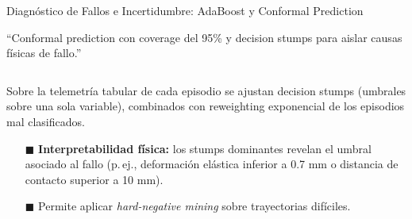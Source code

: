 \documentclass[aspectratio=169,10pt,xcolor={dvipsnames,table}]{beamer}
\newcommand{\BannerFont}{\fontsize{7.5}{9.2}\selectfont\bfseries}       %
\newcommand{\CardTitleFont}{\fontsize{7.5}{9}\selectfont\bfseries}      %
\newcommand{\BodyFont}{\fontsize{6.2}{7.8}\selectfont}                  %
\newcommand{\CardArc}{2pt}                 %
\newcommand{\CardRule}{0.6pt}              %
\newcommand{\BannerArc}{1.5pt}             %
\newcommand{\BannerRule}{0.5pt}            %
\newcommand{\BannerLeftRule}{2.5pt}        %
\newcommand{\CardHeightDouble}{42.5mm}     %
\newcommand{\BannerCentral}[2][UCNCyan]{%
  \begin{tcolorbox}[
    enhanced,
    colback=#1!10,
    colframe=#1,
    boxrule=\BannerRule,
    leftrule=\BannerLeftRule,
    arc=\BannerArc,
    top=0.35mm, bottom=0.35mm, left=2mm, right=2mm
  ]
    {\BannerFont\raggedright\textcolor{UCNBlue}{#2}\par}
  \end{tcolorbox}%
  \vspace{-2.5mm}%
}
\newcommand{\BannerRef}[1]{{\mdseries\fontsize{5}{6}\selectfont\textcolor{TextDark!65}{\cite{#1}}}} %
\begin{document}
\begin{frame}{Diagnóstico de Fallos e Incertidumbre: AdaBoost y Conformal Prediction}
  \BannerCentral[GoldGORE]{``Conformal prediction con coverage del 95\% y decision stumps para aislar causas físicas de fallo.'' \BannerRef{freund1997decision,angelopoulos2023conformal,wang2026srif,qi2026gpc}}
  \vspace{0.8mm}
  \begin{columns}[T, onlytextwidth]
    \begin{column}{0.485\textwidth}
      \begin{tcolorbox}[
        enhanced,
        colback=WhiteBg,
        colframe=GoldGORE,
        arc=\CardArc,
        boxrule=\CardRule,
        height=\CardHeightDouble,
        title={\CardTitleFont AdaBoost con Decision Stumps},
        colbacktitle=GoldGORE,
        coltitle=WhiteBg,
        top=1.0mm, bottom=1.0mm, left=1.6mm, right=1.6mm
      ]
        {\BodyFont
        Sobre la telemetría tabular de cada episodio se ajustan decision stumps (umbrales sobre una sola variable), combinados con reweighting exponencial de los episodios mal clasificados.
        \vspace{0.6mm}
        \begin{itemize}\setlength{\itemsep}{0.6pt}
          \item[\textcolor{GoldGORE}{$\blacksquare$}] \textbf{Interpretabilidad física:} los stumps dominantes revelan el umbral asociado al fallo (p.\,ej., deformación elástica inferior a 0.7 mm o distancia de contacto superior a 10 mm).
          \item[\textcolor{GoldGORE}{$\blacksquare$}] Permite aplicar \textit{hard-negative mining} sobre trayectorias difíciles.
        \end{itemize}}
      \end{tcolorbox}
    \end{column}


\end{columns}
\end{frame}
\end{document}
